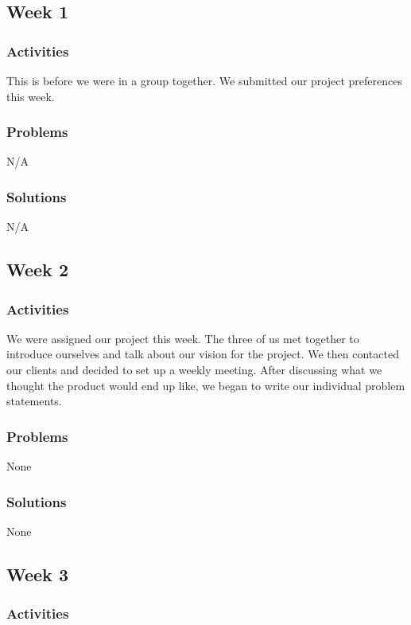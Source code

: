 \documentclass[IEEEtran,letterpaper,10pt,titlepage,fleqn,draftclsnofoot,onecolumn]{article}
\begin{document}
\subsection{Week 1}
\subsubsection{Activities}

This is before we were in a group together. We submitted our project preferences this week.

\subsubsection{Problems}

N/A

\subsubsection{Solutions}

N/A

\subsection{Week 2}
\subsubsection{Activities}

We were assigned our project this week. The three of us met together to introduce ourselves and talk about our vision for the project. We then contacted our  clients and decided to set up a weekly meeting. After discussing what we thought the product would end up like, we began to write our individual problem statements. 

\subsubsection{Problems}

None

\subsubsection{Solutions}

None

\subsection{Week 3}
\subsubsection{Activities}
\end{document}
